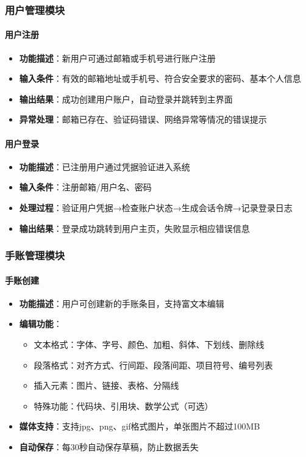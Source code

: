 \documentclass[a4paper]{article}
\begin{document}
\subsubsection{用户管理模块}

\paragraph{用户注册}
\begin{itemize}
    \item \textbf{功能描述}：新用户可通过邮箱或手机号进行账户注册
    \item \textbf{输入条件}：有效的邮箱地址或手机号、符合安全要求的密码、基本个人信息
    \item \textbf{输出结果}：成功创建用户账户，自动登录并跳转到主界面
    \item \textbf{异常处理}：邮箱已存在、验证码错误、网络异常等情况的错误提示
\end{itemize}

\paragraph{用户登录}
\begin{itemize}
    \item \textbf{功能描述}：已注册用户通过凭据验证进入系统
    \item \textbf{输入条件}：注册邮箱/用户名、密码
    \item \textbf{处理过程}：验证用户凭据→检查账户状态→生成会话令牌→记录登录日志
    \item \textbf{输出结果}：登录成功跳转到用户主页，失败显示相应错误信息
\end{itemize}


\subsubsection{手账管理模块}

\paragraph{手账创建}
\begin{itemize}
    \item \textbf{功能描述}：用户可创建新的手账条目，支持富文本编辑
    \item \textbf{编辑功能}：
    \begin{itemize}
        \item 文本格式：字体、字号、颜色、加粗、斜体、下划线、删除线
        \item 段落格式：对齐方式、行间距、段落间距、项目符号、编号列表
        \item 插入元素：图片、链接、表格、分隔线
        \item 特殊功能：代码块、引用块、数学公式（可选）
    \end{itemize}
    \item \textbf{媒体支持}：支持jpg、png、gif格式图片，单张图片不超过100MB
    \item \textbf{自动保存}：每30秒自动保存草稿，防止数据丢失
\end{itemize}
\end{document}
